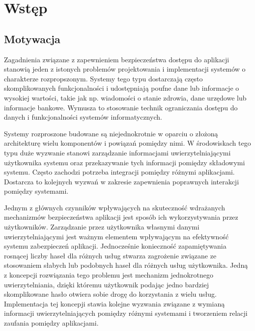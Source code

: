 \chapter{Wstęp}
\label{cha:wstep}


\section{Motywacja}
\label{sec:motywacja}

Zagadnienia związane z zapewnieniem bezpieczeństwa dostępu do aplikacji stanowią jeden z istonych problemów projektowania i implementacji systemów o charakterze rozpropszonym. Systemy tego typu dostarczają często skomplikowanych funkcjonalności i udostępniają poufne dane lub informacje o wysokiej wartości, takie jak np. wiadomości o stanie zdrowia, dane urzędowe lub informacje bankowe. Wymusza to stosowanie technik ograniczania dostępu do danych i funkcjonalności systemów informatycznych.

Systemy rozproszone budowane są niejednokrotnie w oparciu o złożoną architekturę wielu komponentów i powiązań pomiędzy nimi. W środowiskach tego typu duże wyzwanie stanowi zarządzanie informacjami uwierzytelniającymi użytkownika systemu oraz przekazywanie tych informacji pomiędzy składowymi systemu. Często zachodzi potrzeba integracji pomiędzy różnymi aplikacjami. Dostarcza to kolejnych wyzwań w zakresie zapewnienia poprawnych interakcji pomiędzy systemami.

Jednym z głównych czynników wpływających na skuteczność wdrażanych mechanizmów bezpieczeństwa aplikacji jest sposób ich wykorzystywania przez użytkowników. Zarządzanie przez użytkownika własnymi danymi uwierzytelniającymi jest ważnym elementem wpływającym na efektywność systemu zabezpieczeń aplikacji. Jednocześnie konieczność zapamiętywania rosnącej liczby haseł dla różnych usług stwarza zagrożenie związane ze stosowaniem słabych lub podobnych haseł dla różnych usług użytkownika. Jedną z koncepcji rozwiązania tego problemu jest mechanizm jednokrotnego uwierzytelniania, dzięki któremu użytkownik podając jedno bardziej skomplikowane hasło otwiera sobie drogę do korzystania z wielu usług. Implementacja tej koncepji stawia kolejne wyzwania związane z wymianą informacji uwierzytelniających pomiędzy różnymi systemami i tworzeniem relacji zaufania pomiędzy  aplikacjami.


